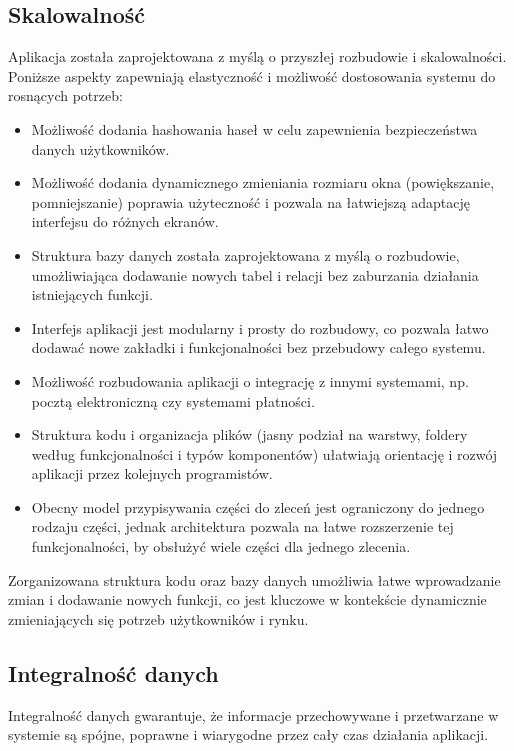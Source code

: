 \subsection{Skalowalność}
\label{sec:skalowalnosc}
Aplikacja została zaprojektowana z myślą o przyszłej rozbudowie i skalowalności. Poniższe aspekty zapewniają elastyczność i możliwość dostosowania systemu do rosnących potrzeb:
\begin{itemize}
    \item Możliwość dodania hashowania haseł w celu zapewnienia bezpieczeństwa danych użytkowników.
    \item Możliwość dodania dynamicznego zmieniania rozmiaru okna (powiększanie, pomniejszanie) poprawia użyteczność i pozwala na łatwiejszą adaptację interfejsu do różnych ekranów.
    \item Struktura bazy danych została zaprojektowana z myślą o rozbudowie, umożliwiająca dodawanie nowych tabel i relacji bez zaburzania działania istniejących funkcji.
    \item Interfejs aplikacji jest modularny i prosty do rozbudowy, co pozwala łatwo dodawać nowe zakładki i funkcjonalności bez przebudowy całego systemu.
    \item Możliwość rozbudowania aplikacji o integrację z innymi systemami, np. pocztą elektroniczną czy systemami płatności. 
    \item Struktura kodu i organizacja plików (jasny podział na warstwy, foldery według funkcjonalności i typów komponentów) ułatwiają orientację i rozwój aplikacji przez kolejnych programistów.
    \item Obecny model przypisywania części do zleceń jest ograniczony do jednego rodzaju części, jednak architektura pozwala na łatwe rozszerzenie tej funkcjonalności, by obsłużyć wiele części dla jednego zlecenia.
\end{itemize}

Zorganizowana struktura kodu oraz bazy danych umożliwia łatwe wprowadzanie zmian i dodawanie nowych funkcji, co jest kluczowe w kontekście dynamicznie zmieniających się potrzeb użytkowników i rynku.

\subsection{Integralność danych}
\label{sec:integralnoscDanych}

Integralność danych gwarantuje, że informacje przechowywane i przetwarzane w systemie są spójne, poprawne i wiarygodne przez cały czas działania aplikacji. 

